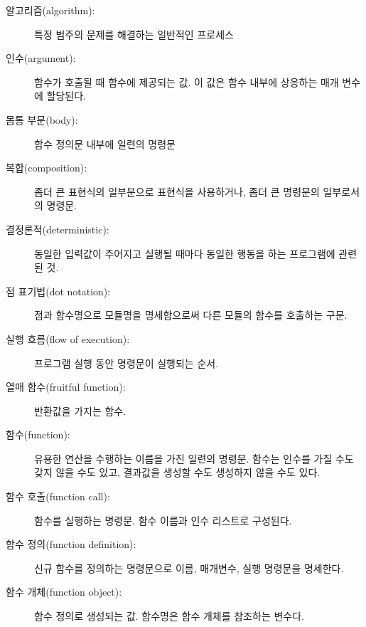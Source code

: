 \begin{description}

\item[알고리즘(algorithm):] 특정 범주의 문제를 해결하는 일반적인 프로세스


\item[인수(argument):] 함수가 호출될 때 함수에 제공되는 값. 이 값은 함수 내부에 상응하는 매개 변수에 할당된다.


\item[몸통 부문(body):] 함수 정의문 내부에 일련의 명령문


\item[복합(composition):] 
좀더 큰 표현식의 일부분으로 표현식을 사용하거나, 좀더 큰 명령문의 일부로서의 명령문.

\item[결정론적(deterministic):] 동일한 입력값이 주어지고 실행될 때마다 동일한 행동을 하는 프로그램에 관련된 것.

\item[점 표기법(dot notation):] 점과 함수명으로 모듈명을 명세함으로써 다른 모듈의 함수를 호출하는 구문.

\item[실행 흐름(flow of execution):] 프로그램 실행 동안 명령문이 실행되는 순서.

\item[열매 함수(fruitful function):] 반환값을 가지는 함수.

\item[함수(function):] 유용한 연산을 수행하는 이름을 가진 일련의 명령문.
함수는 인수를 가질 수도 갖지 않을 수도 있고, 결과값을 생성할 수도 생성하지 않을 수도 있다.

\item[함수 호출(function call):] 함수를 실행하는 명령문. 함수 이름과 인수 리스트로 구성된다.

\item[함수 정의(function definition):] 신규 함수를 정의하는 명령문으로 이름, 매개변수, 실행 명령문을 명세한다.

\item[함수 개체(function object):] 함수 정의로 생성되는 값. 함수명은 함수 개체를 참조하는 변수다.


\end{description}
